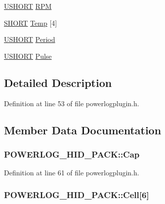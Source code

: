 \begin{DoxyCompactItemize}
\item 
\hyperlink{group__powerlogplugin_ga5850d5316caf7f4cedd742fdf8cd7c02}{\-U\-S\-H\-O\-R\-T} \hyperlink{struct_p_o_w_e_r_l_o_g___h_i_d___p_a_c_k_a037c72ffcf73e0ce8bcb6933441411bd}{\-R\-P\-M}
\item 
\hyperlink{group__powerlogplugin_ga9909bd3cf05f0906045f2ee85be4eeac}{\-S\-H\-O\-R\-T} \hyperlink{struct_p_o_w_e_r_l_o_g___h_i_d___p_a_c_k_a77fb2418138dbe5af859e51cbb4532eb}{\-Temp} \mbox{[}4\mbox{]}
\item 
\hyperlink{group__powerlogplugin_ga5850d5316caf7f4cedd742fdf8cd7c02}{\-U\-S\-H\-O\-R\-T} \hyperlink{struct_p_o_w_e_r_l_o_g___h_i_d___p_a_c_k_ad43cc2c3695fdd46953a602029e16fed}{\-Period}
\item 
\hyperlink{group__powerlogplugin_ga5850d5316caf7f4cedd742fdf8cd7c02}{\-U\-S\-H\-O\-R\-T} \hyperlink{struct_p_o_w_e_r_l_o_g___h_i_d___p_a_c_k_a761dee2316036998786b770e26d29736}{\-Pulse}
\end{DoxyCompactItemize}


\subsection{\-Detailed \-Description}


\-Definition at line 53 of file powerlogplugin.\-h.



\subsection{\-Member \-Data \-Documentation}
\hypertarget{struct_p_o_w_e_r_l_o_g___h_i_d___p_a_c_k_a17471b70ab588a58cfdbf608a04a3d53}{
\subsubsection[{\-Cap}]{ {\bf \-P\-O\-W\-E\-R\-L\-O\-G\-\_\-\-H\-I\-D\-\_\-\-P\-A\-C\-K\-::\-Cap}}}\label{struct_p_o_w_e_r_l_o_g___h_i_d___p_a_c_k_a17471b70ab588a58cfdbf608a04a3d53}


\-Definition at line 61 of file powerlogplugin.\-h.

\hypertarget{struct_p_o_w_e_r_l_o_g___h_i_d___p_a_c_k_a13d6b3eadb4447aa5353664cf897a504}{
\subsubsection[{\-Cell}]{ {\bf \-P\-O\-W\-E\-R\-L\-O\-G\-\_\-\-H\-I\-D\-\_\-\-P\-A\-C\-K\-::\-Cell}\mbox{[}6\mbox{]}}}\label{struct_p_o_w_e_r_l_o_g___h_i_d___p_a_c_k_a13d6b3eadb4447aa5353664cf897a504}


